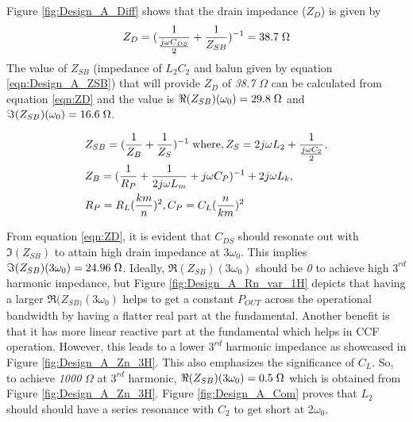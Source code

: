 \documentclass[conference]{IEEEtran}
\begin{document}
Figure \ref{fig:Design_A_Diff} shows that the drain impedance ($Z_D$) is given by
\begin{equation}
    Z_D=(\frac{1}{\frac{j\omega C_{DS}}{2}}+\frac{1}{Z_{SB}})^{-1}=38.7 \hspace{1mm} \Omega
    \label{eqn:ZD}
\end{equation}
The value of $Z_{SB}$ (impedance of $L_2C_2$ and balun given by equation \ref{eqn:Design_A_ZSB}) that will provide $Z_D$ of \textit{38.7} $\Omega$ can be calculated from equation \ref{eqn:ZD} and the value is $\Re(Z_{SB})(\omega_0) =  29.8\hspace{1mm} \Omega$ and $\Im(Z_{SB})(\omega_0) = 16.6\hspace{1mm}\Omega$.

\begin{equation}
\begin{aligned}
    &Z_{SB}=(\frac{1}{Z_B}+\frac{1}{Z_S})^{-1}
    \hspace{1mm}\text{where}, Z_S=2j\omega  L_2+\frac{1}{\frac{j \omega C_2}{2}}, \\
    &Z_B=(\frac{1}{R_P}+\frac{1}{2j \omega  L_m}+j \omega C_P)^{-1}+2j \omega  L_k,\\ &R_P=R_L(\frac{km}{n})^2,C_P=C_L(\frac{n}{km})^2
\label{eqn:Design_A_ZSB}
\end{aligned}
\end{equation}

From equation \ref{eqn:ZD}, it is evident that $C_{DS}$ should resonate out with $\Im(Z_{SB})$  to attain high drain impedance at $3\omega_0$. This implies $\Im(Z_{SB})(3\omega_0) = 24.96\hspace{1mm}\Omega$.
Ideally, $\Re(Z_{SB})(3\omega_0)$ should be \textit{0} to achieve high $3^{rd}$ harmonic impedance, but Figure \ref{fig:Design_A_Rn_var_1H} depicts that having a larger $\Re(Z_{SB)}(3\omega_0)$ helps to get a constant $P_{OUT}$ across the operational bandwidth by having a flatter real part at the fundamental. Another benefit is that it has more linear reactive part at the fundamental which helps in CCF operation.
However, this leads to a lower $3^{rd}$ harmonic impedance as showcased in Figure \ref{fig:Design_A_Zn_3H}. This also emphasizes  the significance of $C_L$. So, to achieve \textit{1000} $\Omega$ at $3^{rd}$ harmonic,  $\Re(Z_{SB})(3\omega_0) = 0.5\hspace{1mm}\Omega$ which is obtained from Figure \ref{fig:Design_A_Zn_3H}. Figure \ref{fig:Design_A_Com} proves that $L_2$ should  should have a series resonance with $C_2$ to get short at 2$\omega_0$.
\end{document}

